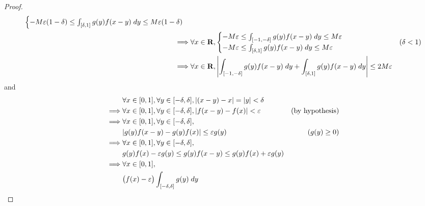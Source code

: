 \begin{proof}
\begin{align*}
\begin{cases}
                                   -M \varepsilon (1 - \delta) \leq \int_{[\delta, 1]} g(y) f(x - y) \; dy \leq M \varepsilon (1 - \delta)
                                 \end{cases} \\
    \implies & \forall x \in \mathbf{R}, \begin{cases}
                                   -M \varepsilon \leq \int_{[-1, -\delta]} g(y) f(x - y) \; dy \leq M \varepsilon \\
                                   -M \varepsilon \leq \int_{[\delta, 1]} g(y) f(x - y) \; dy \leq M \varepsilon
                                 \end{cases}                           & (\delta < 1)                           \\
    \implies & \forall x \in \mathbf{R}, \left\lvert\int_{[-1, -\delta]} g(y) f(x - y) \; dy + \int_{[\delta, 1]} g(y) f(x - y) \; dy\right\rvert \leq 2 M \varepsilon
  \end{align*}
  and
  \begin{align*}
             & \forall x \in [0, 1], \forall y \in [-\delta, \delta], \abs{(x - y) - x} = \abs{y} < \delta                                                                 \\
    \implies & \forall x \in [0, 1], \forall y \in [-\delta, \delta], \abs{f(x - y) - f(x)} < \varepsilon                                    & \text{(by hypothesis)}      \\
    \implies & \forall x \in [0, 1], \forall y \in [-\delta, \delta],                                                                                                      \\
             & \abs{g(y) f(x - y) - g(y) f(x)} \leq \varepsilon g(y)                                                                         & (g(y) \geq 0)               \\
    \implies & \forall x \in [0, 1], \forall y \in [-\delta, \delta],                                                                                                      \\
             & g(y) f(x) - \varepsilon g(y) \leq g(y) f(x - y) \leq g(y) f(x) + \varepsilon g(y)                                                                           \\
    \implies & \forall x \in [0, 1],                                                                                                                                       \\
             & \big(f(x) - \varepsilon\big) \int_{[-\delta, \delta]} g(y) \; dy                                                                                            \\

\end{align*}
\end{proof}
